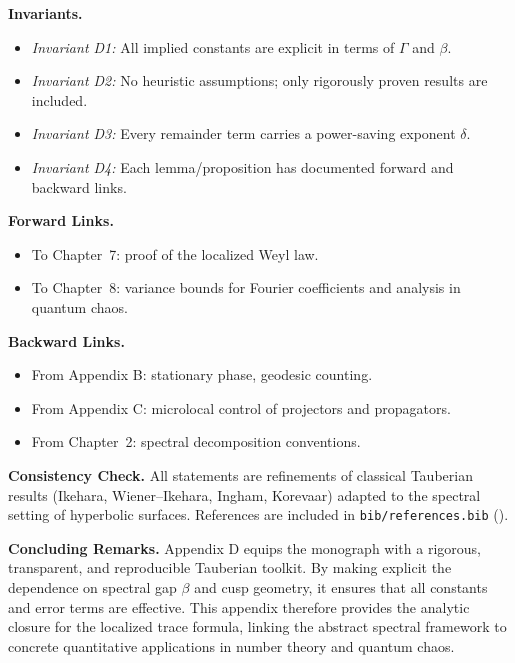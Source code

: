 \medskip

\noindent \textbf{Invariants.}
\begin{itemize}
  \item \emph{Invariant D1:} All implied constants are explicit in terms of $\Gamma$ and $\beta$.  
  \item \emph{Invariant D2:} No heuristic assumptions; only rigorously proven results are included.  
  \item \emph{Invariant D3:} Every remainder term carries a power-saving exponent $\delta$.  
  \item \emph{Invariant D4:} Each lemma/proposition has documented forward and backward links.  
\end{itemize}

\medskip

\noindent \textbf{Forward Links.}
\begin{itemize}
  \item To Chapter~7: proof of the localized Weyl law.  
  \item To Chapter~8: variance bounds for Fourier coefficients and analysis in quantum chaos.  
\end{itemize}

\noindent \textbf{Backward Links.}
\begin{itemize}
  \item From Appendix B: stationary phase, geodesic counting.  
  \item From Appendix C: microlocal control of projectors and propagators.  
  \item From Chapter~2: spectral decomposition conventions.  
\end{itemize}

\medskip

\noindent \textbf{Consistency Check.}  
All statements are refinements of classical Tauberian results (Ikehara, Wiener--Ikehara, Ingham, Korevaar) adapted to the spectral setting of hyperbolic surfaces.  
References are included in \texttt{bib/references.bib} (\cite{Ikehara1931, Ingham1935, Korevaar2004, Iwaniec2002, Zworski2012}).  

\medskip

\noindent \textbf{Concluding Remarks.}  
Appendix D equips the monograph with a rigorous, transparent, and reproducible Tauberian toolkit.  
By making explicit the dependence on spectral gap $\beta$ and cusp geometry, it ensures that all constants and error terms are effective.  
This appendix therefore provides the analytic closure for the localized trace formula, linking the abstract spectral framework to concrete quantitative applications in number theory and quantum chaos.


